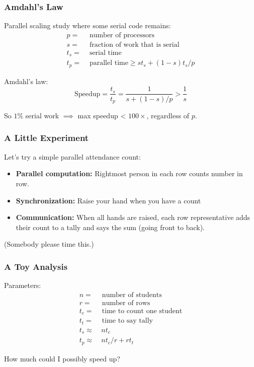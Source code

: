 \documentclass{beamer}
\begin{document}
\begin{frame}
  \frametitle{Amdahl's Law}

  Parallel scaling study where some serial code remains:
  \begin{align*}
    p = & \mbox{ number of processors} \\
    s = & \mbox{ fraction of work that is serial} \\
    t_s = & \mbox{ serial time} \\
    t_p = & \mbox{ parallel time} \geq s t_s + (1-s) t_s / p
  \end{align*}

  \vspace{2mm}
  Amdahl's law:
  \[
    \mbox{Speedup} = 
      \frac{t_s}{t_p} = \frac{1}{s + (1-s) / p} > \frac{1}{s}
  \]

  \vspace{5mm}
  So $1\%$ serial work $\implies$ max speedup < $100 \times$,
  regardless of $p$.
\end{frame}

\begin{frame}
  \frametitle{A Little Experiment}
  
  Let's try a simple parallel attendance count:
  \begin{itemize}
  \item {\bf Parallel computation:} Rightmost person in each row 
    counts number in row.
  \item {\bf Synchronization:} Raise your hand when you have a count
  \item {\bf Communication:} When all hands are raised, each row 
        representative adds their count to a tally and says the sum
        (going front to back).
  \end{itemize}

  \vspace{5mm}
  (Somebody please time this.)

\end{frame}


\begin{frame}
  \frametitle{A Toy Analysis}

  Parameters:
  \begin{align*}
    n = & \mbox{ number of students} \\
    r = & \mbox{ number of rows} \\
    t_c = & \mbox{ time to count one student} \\
    t_t = & \mbox{ time to say tally} \\
    t_s \approx & ~n t_c \\
    t_p \approx & ~n t_c / r + r t_t
  \end{align*}

  \vspace{5mm}
  How much could I possibly speed up?

\end{frame}
\end{document}
